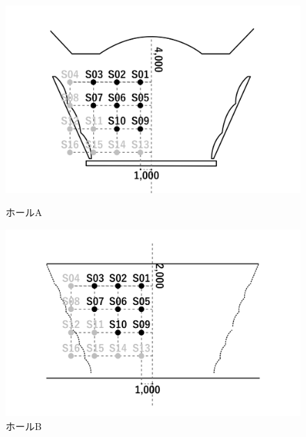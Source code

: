 \documentclass[11pt,a4j]{jreport}
\begin{document}

\newpage
\begin{figure}[H]
  \centering
  \begin{minipage}[b]{.5\textwidth}
    \centering
    \includegraphics[width=.9\linewidth]{images/measuredHalls/flatud_hall_a.png}
    \caption*{ホールA}
  \end{minipage}%
  \begin{minipage}[b]{.5\textwidth}
    \centering
    \includegraphics[width=.9\linewidth]{images/measuredHalls/flatud_hall_b.png}
    \caption*{ホールB}
  \end{minipage}


\end{figure}
\end{document}
